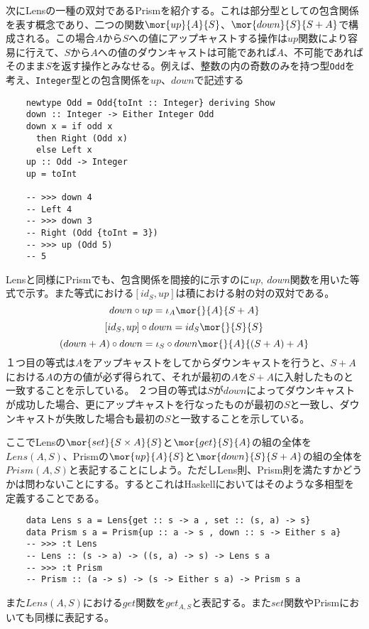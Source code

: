 \documentclass[uplatex,dvipdfmx]{jsarticle}
\newcommand{\pr}[1]{\colorbox[rgb]{0.9,0.9,0.9}{\lstinline{#1}}}
\begin{document}
  次にLensの一種の双対であるPrismを紹介する。これは部分型としての包含関係を表す概念であり、二つの関数$\mor{up}{A}{S}$、$\mor{down}{S}{S+A}$で構成される。この場合$A$から$S$への値にアップキャストする操作は$up$関数により容易に行えて、$S$から$A$への値のダウンキャストは可能であれば$A$、不可能であればそのまま$S$を返す操作とみなせる。例えば、整数の内の奇数のみを持つ型\pr{Odd}を考え、\pr{Integer}型との包含関係を$up$、$down$で記述する
  \begin{lstlisting}   
    newtype Odd = Odd{toInt :: Integer} deriving Show
    down :: Integer -> Either Integer Odd
    down x = if odd x 
      then Right (Odd x)
      else Left x
    up :: Odd -> Integer
    up = toInt

    -- >>> down 4
    -- Left 4
    -- >>> down 3
    -- Right (Odd {toInt = 3})
    -- >>> up (Odd 5)
    -- 5
  \end{lstlisting}
  Lensと同様にPrismでも、包含関係を間接的に示すのに$up,\ down$関数を用いた等式で示す。また等式における$[id_S,up]$は積における射の対の双対である。
  \[down\circ up = \iota_A\mor{}{A}{S+A}\]
  \[[id_S,up]\circ down = id_S\mor{}{S}{S}\]
  \[(down+A)\circ down = \iota_S\circ down\mor{}{A}{(S+A)+A}\]
  １つ目の等式は$A$をアップキャストをしてからダウンキャストを行うと、$S+A$における$A$の方の値が必ず得られて、それが最初の$A$を$S+A$に入射したものと一致することを示している。
  ２つ目の等式は$S$が$down$によってダウンキャストが成功した場合、更にアップキャストを行なったものが最初の$S$と一致し、ダウンキャストが失敗した場合も最初の$S$と一致することを示している。
  
  ここでLensの$\mor{set}{S\times A}{S}$と$\mor{get}{S}{A}$の組の全体を$Lens(A,S)$、Prismの$\mor{up}{A}{S}$と$\mor{down}{S}{S+A}$の組の全体を$Prism(A,S)$と表記することにしよう。ただしLens則、Prism則を満たすかどうかは問わないことにする。するとこれはHaskellにおいてはそのような多相型を定義することである。
  \begin{lstlisting}
    data Lens s a = Lens{get :: s -> a , set :: (s, a) -> s}
    data Prism s a = Prism{up :: a -> s , down :: s -> Either s a}
    -- >>> :t Lens
    -- Lens :: (s -> a) -> ((s, a) -> s) -> Lens s a
    -- >>> :t Prism
    -- Prism :: (a -> s) -> (s -> Either s a) -> Prism s a
  \end{lstlisting}

  また$Lens(A,S)$における$get$関数を$get_{A,S}$と表記する。また$set$関数やPrismにおいても同様に表記する。
  
\end{document}
